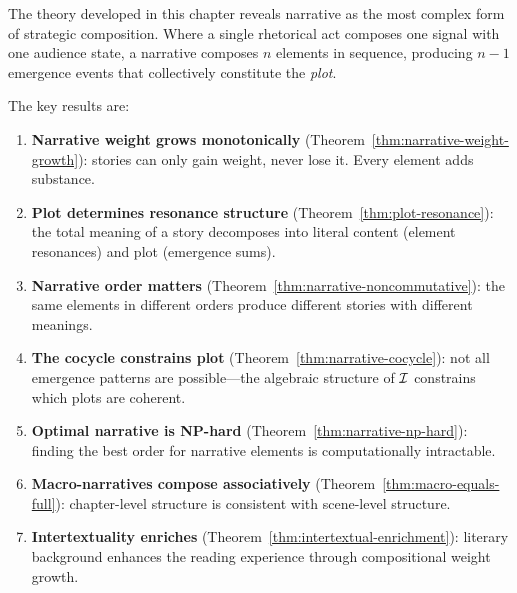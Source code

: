 \begin{interpretation}
\label{interp:final-narrative}
The theory developed in this chapter reveals narrative as the most complex
form of strategic composition.  Where a single rhetorical act composes one
signal with one audience state, a narrative composes $n$ elements in
sequence, producing $n-1$ emergence events that collectively constitute
the \emph{plot}.

The key results are:

\begin{enumerate}
  \item \textbf{Narrative weight grows monotonically}
        (Theorem~\ref{thm:narrative-weight-growth}): stories can only gain
        weight, never lose it.  Every element adds substance.

  \item \textbf{Plot determines resonance structure}
        (Theorem~\ref{thm:plot-resonance}): the total meaning of a story
        decomposes into literal content (element resonances) and plot
        (emergence sums).

  \item \textbf{Narrative order matters}
        (Theorem~\ref{thm:narrative-noncommutative}): the same elements in
        different orders produce different stories with different meanings.

  \item \textbf{The cocycle constrains plot}
        (Theorem~\ref{thm:narrative-cocycle}): not all emergence patterns
        are possible---the algebraic structure of $\mathcal{I}$ constrains which
        plots are coherent.

  \item \textbf{Optimal narrative is NP-hard}
        (Theorem~\ref{thm:narrative-np-hard}): finding the best order for
        narrative elements is computationally intractable.

  \item \textbf{Macro-narratives compose associatively}
        (Theorem~\ref{thm:macro-equals-full}): chapter-level structure is
        consistent with scene-level structure.

  \item \textbf{Intertextuality enriches}
        (Theorem~\ref{thm:intertextual-enrichment}): literary background
        enhances the reading experience through compositional weight growth.
\end{enumerate}


\end{interpretation}
